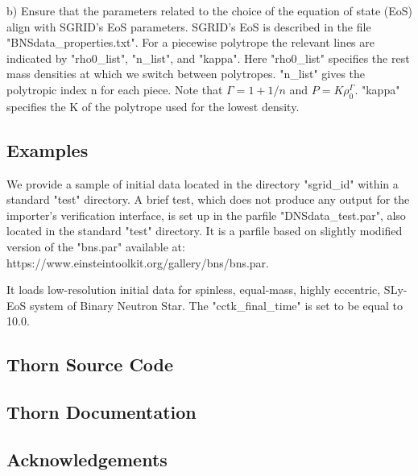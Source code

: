 b) Ensure that the parameters related to the choice of the equation of state
(EoS) align with SGRID's EoS parameters. SGRID's EoS is described in the
file "BNSdata\_properties.txt". For a piecewise polytrope the relevant lines
are indicated by "rho0\_list", "n\_list", and "kappa". Here "rho0\_list"
specifies the rest mass densities at which we switch between polytropes.
"n\_list" gives the polytropic index n for each piece. Note that
   $\Gamma = 1 + 1/n$    and    $P = K \rho_0^\Gamma$.
"kappa" specifies the K of the polytrope used for the lowest density.

\subsection{Examples}

We provide a sample of initial data located in the directory "sgrid\_id" within a standard "test" directory. A brief test, which does not produce any output for the importer's verification interface, is set up in the parfile "DNSdata\_test.par", also located in the standard "test" directory. It is a parfile based on slightly modified version of the "bns.par" available at: https://www.einsteintoolkit.org/gallery/bns/bns.par.

It loads low-resolution initial data for spinless, equal-mass, highly eccentric, SLy-EoS system of Binary Neutron Star. The "cctk\_final\_time" is set to be equal to 10.0.




\subsection{Thorn Source Code}

\subsection{Thorn Documentation}

\subsection{Acknowledgements}



